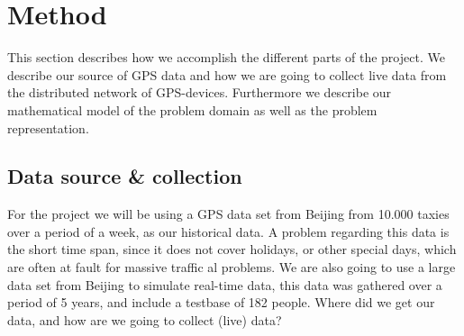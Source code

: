 \section{Method}
This section describes how we accomplish the different parts of the project. We describe our source of GPS data and how we are going to collect live data from the distributed network of GPS-devices. Furthermore we describe our mathematical model of the problem domain as well as the problem representation.

\subsection*{Data source \& collection}
For the project we will be using a GPS data set from Beijing from 10.000 taxies over a period of a week, as our historical data. A problem regarding this data is the short time span, since it does not cover holidays, or other special days, which are often at fault for massive traffic al problems. We are also going to use a large data set from Beijing to simulate real-time data, this data was gathered over a period of 5 years, and include a testbase of 182 people.
Where did we get our data, and how are we going to collect (live) data?

